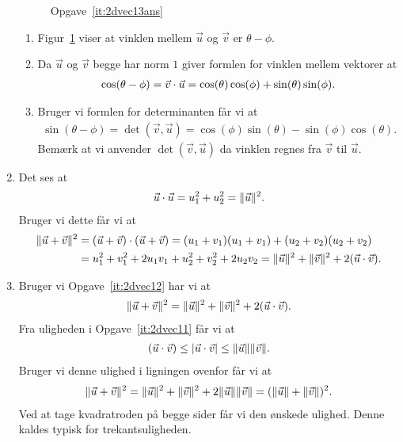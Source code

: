 \begin{enumerate}
\begin{figure}
		\caption{Opgave~\ref{it:2dvec13ans}}
		\label{fig:2dvec13ans}
	\end{figure}
		\begin{enumerate}
			\item Figur~\ref{fig:2dvec13ans} viser at vinklen mellem $\vec{u}$ og $\vec{v}$ er $\theta-\phi$.
			\item Da $\vec{u}$ og $\vec{v}$ begge har norm $1$ giver formlen for vinklen mellem vektorer at
			\begin{align*}
			\cos(\theta-\phi)=\vec{v}\cdot \vec{u}=\cos(\theta)\cos(\phi)+\sin(\theta)\sin(\phi).
			\end{align*}
			\item Bruger vi formlen for determinanten får vi at 
			\begin{align*}
			\sin(\theta-\phi)=\det(\vec{v},\vec{u})=\cos(\phi)\sin(\theta)-\sin(\phi)\cos(\theta).
			\end{align*}
			Bemærk at vi anvender $\det(\vec{v},\vec{u})$ da vinklen regnes fra $\vec{v}$ til $\vec{u}$.
			
		\end{enumerate}
	
	
	\item\label{it:2dvec12ans} Det ses at
	\begin{align*}
	\vec{u}\cdot \vec{u}=u_1^2+u_2^2=\Vert \vec{u}\Vert^2.
	\end{align*}
	Bruger vi dette får vi at 
	\begin{align*}
	\Vert \vec{u}+\vec{v}\Vert^2&=(\vec{u}+\vec{v})\cdot (\vec{u}+\vec{v})= (u_1+v_1)(u_1+v_1)+(u_2+v_2)(u_2+v_2)\\&=u_1^2+v_1^2+2u_1v_1+u_2^2+v_2^2+2u_2v_2=\Vert \vec{u}\Vert^2+\Vert \vec{v}\Vert^2+2(\vec{u}\cdot \vec{v}).
	\end{align*}
	
	\item Bruger vi Opgave~\ref{it:2dvec12} har vi at
	\begin{align*}
	\Vert \vec{u}+\vec{v}\Vert^2=\Vert \vec{u}\Vert^2+\Vert \vec{v}\Vert^2+2(\vec{u}\cdot \vec{v}).
	\end{align*}
	Fra uligheden i Opgave~\ref{it:2dvec11} får vi at
	\begin{align*}
	(\vec{u}\cdot \vec{v}) \leq \vert \vec{u}\cdot \vec{v}\vert\leq \Vert \vec{u}\Vert\Vert \vec{v}\Vert.
	\end{align*}
	Bruger vi denne ulighed i ligningen ovenfor får vi at
	\begin{align*}
	\Vert \vec{u}+\vec{v}\Vert^2=\Vert \vec{u}\Vert^2+\Vert \vec{v}\Vert^2+2\Vert \vec{u}\Vert\Vert \vec{v}\Vert=(\Vert \vec{u}\Vert+\Vert \vec{v}\Vert)^2.
	\end{align*}
	Ved at tage kvadratroden på begge sider får vi den ønskede ulighed. Denne kaldes typisk for trekantsuligheden.
	

\end{enumerate}
